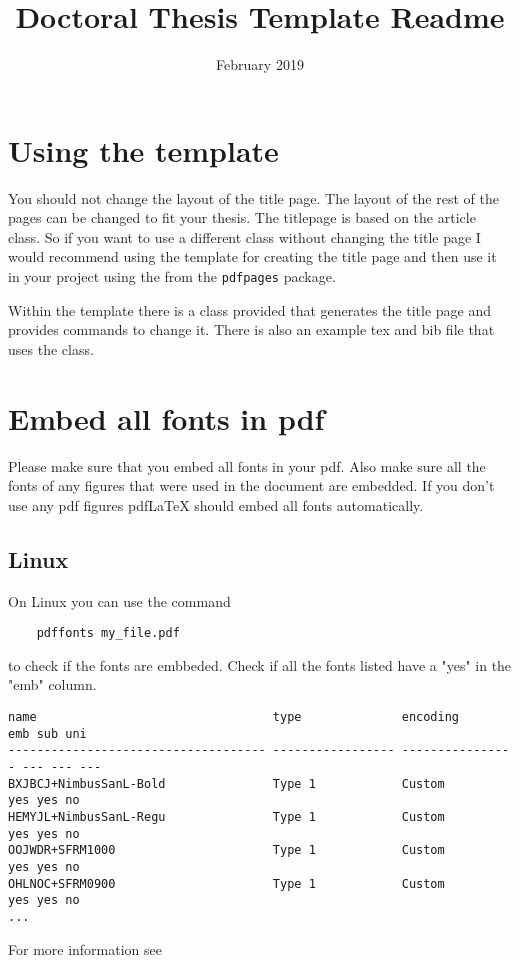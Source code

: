 \documentclass{article}
\title{Doctoral Thesis Template Readme}
\date{February 2019}
\begin{document}
\maketitle

\section{Using the template}
You should not change the layout of the title page. The layout of the rest of the pages can be changed to fit your thesis.
The titlepage is based on the article class. So if you want to use a different class without changing the title page I would recommend using the template for creating the title page and then use it in your project using the 
\verb|| from the \verb|pdfpages| package. \newline 


Within the template there is a class provided that generates the title page and provides commands to change it. 
There is also an example tex and bib file that uses the class. 

\section{Embed all fonts in pdf}
Please make sure that you embed all fonts in your pdf. Also make sure all the fonts of any figures that were used in the document are embedded. 
If you don't use any pdf figures pdfLaTeX should embed all fonts automatically.

\subsection{Linux}
On Linux you can use the command \begin{verbatim}
    pdffonts my_file.pdf
\end{verbatim}
to check if the fonts are embbeded. Check if all the fonts listed have a "yes" in the "emb" column. 
\begin{verbatim}
name                                 type              encoding         emb sub uni 
------------------------------------ ----------------- ---------------- --- --- --- 
BXJBCJ+NimbusSanL-Bold               Type 1            Custom           yes yes no     
HEMYJL+NimbusSanL-Regu               Type 1            Custom           yes yes no     
OOJWDR+SFRM1000                      Type 1            Custom           yes yes no      
OHLNOC+SFRM0900                      Type 1            Custom           yes yes no   
...
\end{verbatim}
For more information see 
\end{document}
